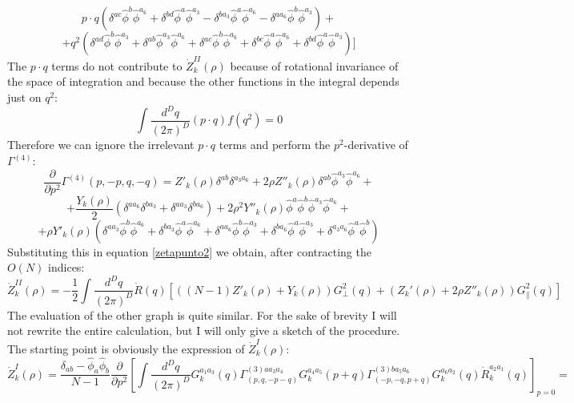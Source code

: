 $$p\cdot q(\delta^{ac}\widehat{\phi}^b\widehat{\phi}^{a_6} + \delta^{bd}\widehat{\phi}^a\widehat{\phi}^{a_3} - \delta^{b{a_3}}\widehat{\phi}^a\widehat{\phi}^{a_6} - \delta^{a{a_6}}\widehat{\phi}^b\widehat{\phi}^{a_3}) + $$
$$ + q^2(\delta^{ad}\widehat{\phi}^b\widehat{\phi}^{a_3} +  \delta^{ab}\widehat{\phi}^{a_3}\widehat{\phi}^{a_6} + \delta^{ac}\widehat{\phi}^b\widehat{\phi}^{a_6} + \delta^{bc}\widehat{\phi}^a\widehat{\phi}^{a_6} + \delta^{bd}\widehat{\phi}^a\widehat{\phi}^{a_3})\Big] $$
The $p\cdot q$ terms do not contribute to $\dot{Z}^{II}_k(\rho)$ because of rotational invariance of the space of integration and because the other functions in the integral depends just on $q^2$:
\begin{equation}
 \int\frac{d^Dq}{(2\pi)^D} (p \cdot q)f(q^2) = 0
\end{equation}
Therefore we can ignore the irrelevant $p\cdot q$ terms and perform the $p^2$-derivative of $\Gamma^{(4)}$:
$$\frac{\partial}{\partial p^2}\Gamma^{(4)}(p,-p,q,-q) = Z'_k(\rho)\delta^{ab}\delta^{{a_3}{a_6}} + 2\rho Z''_k(\rho)\delta^{ab}\widehat{\phi}^{a_3}\widehat{\phi}^{a_6} + $$
$$ + \frac{Y_k(\rho)}{2}(\delta^{aa_6}\delta^{ba_3} + \delta^{aa_3}\delta^{ba_6}) + 2\rho^2Y''_k(\rho)\widehat{\phi}^{a}\widehat{\phi}^{b}\widehat{\phi}^{a_3}\widehat{\phi}^{a_6} + $$
\begin{equation}
+\rho Y'_k(\rho)(\delta^{aa_3}\widehat{\phi}^{b}\widehat{\phi}^{a_6} + \delta^{ba_3}\widehat{\phi}^{a}\widehat{\phi}^{a_6} + \delta^{aa_6}\widehat{\phi}^{b}\widehat{\phi}^{a_3} + \delta^{ba_6}\widehat{\phi}^{a}\widehat{\phi}^{a_3} + \delta^{a_3a_6}\widehat{\phi}^{a}\widehat{\phi}^{b})
\end{equation}
Substituting this in equation \eqref{zetapunto2} we obtain, after contracting the $O(N)$ indices:
\begin{equation}
 \dot{Z}_k^{II}(\rho) = -\frac{1}{2}\int\frac{d^Dq}{(2\pi)^D}\dot{R}(q)\left[((N-1)Z'_k(\rho) + Y_k(\rho))G^2_\perp(q) + (Z_k'(\rho) + 2\rho Z''_k(\rho))G^2_\parallel(q)\right]
\end{equation}
The evaluation of the other graph is quite similar. For the sake of brevity I will not rewrite the entire calculation,
but I will only give a sketch of the procedure. The starting point is obviously the expression of $\dot{Z}^{I}_k(\rho)$:
\begin{equation}
\dot{Z}^{I}_k(\rho) = \frac{\delta_{ab} - \widehat{\phi}_a\widehat{\phi}_b}{N-1} \frac{\partial}{\partial p^2}\left[\int \frac{d^Dq}{(2\pi)^D} {G}_k^{a_1a_3}(q) {\Gamma}^{(3)aa_3a_4}_{(p, q, -p-q)} {G}_k^{a_4a_5}(p + q){\Gamma}^{(3)ba_5a_6}_{(-p,-q,p+q)}{G}_k^{a_6a_2}(q)\dot{R}^{a_2a_1}_k(q)\right]_{p=0} =
\end{equation}
